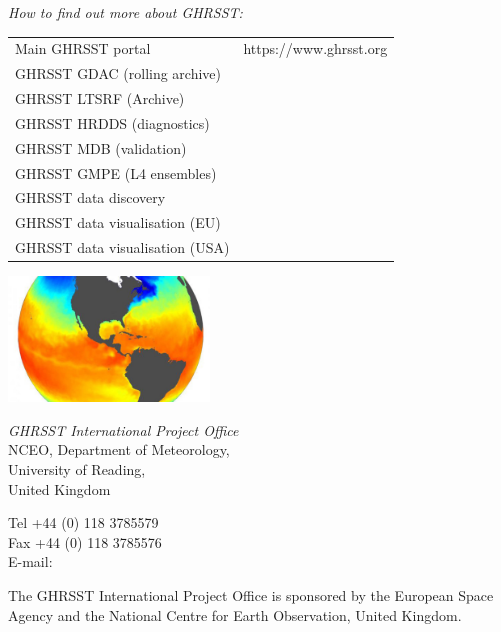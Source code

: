 \pagebreak 
\centering
\emph{\color{MidnightBlue} \Huge How to find out more about GHRSST:}
\newp
\color{MidnightBlue}{A complete description of GHRSST together with all project documentation can be found at the
following web spaces:}
\par
\begin{longtable}{p{} p{}}

Main GHRSST portal & https://www.ghrsst.org \\
GHRSST GDAC (rolling archive) & \color{blue}{\url{http://ghrsst.jpl.nasa.gov}} \\
GHRSST LTSRF (Archive) & \color{blue}{\url{http://ghrsst.nodc.noaa.gov}} \\
GHRSST HRDDS (diagnostics) & \color{blue}{\url{http://www.hrdds.net}}\\
GHRSST MDB (validation) & \color{blue}{\url{http://www.ifremer.fr/matchupdb}} \\
GHRSST GMPE (L4 ensembles) &
\color{blue}{\url{http://ghrsst-pp.metoffice.com/pages/latest\_analysis/sst\_monitor/daily/ens/index.html}} \\
GHRSST data discovery & \color{blue}{\url{http://ghrsst.jpl.nasa.gov/data\_search.html}} \\
GHRSST data visualisation (EU) & \color{blue}{\url{http://www.naiad.fr}} \\
GHRSST data visualisation (USA) & \color{blue}{\url{http://podaac-tools.jpl.nasa.gov/dataminer/}} \\
\end{longtable}

\includegraphics[width=0.4\textwidth]{../images/globe_1000px.jpeg}
\newp

\large{\color{MidnightBlue}\emph{GHRSST International Project Office}} \\
\normalsize
\color{MidnightBlue}NCEO, Department of Meteorology, \\
University of Reading, \\
United Kingdom
\newp

Tel +44 (0) 118 3785579 \\
Fax +44 (0) 118 3785576 \\
E-mail: \\
\color{blue}{ghrsst-po@nceo.ac.uk}
\color{MidnightBlue}

\thispagestyle{empty}
\vfill
\footnotesize The GHRSST International Project Office is sponsored by the European Space Agency
and the National Centre for Earth Observation, United Kingdom.